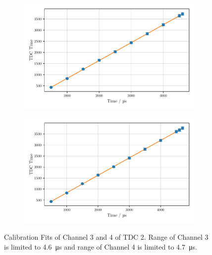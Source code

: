 \begin{figure}
    \centering
    \begin{subfigure}[b]{0.48\textwidth}
        \includegraphics[width=\textwidth]{plots/tdc10.pdf}
    \end{subfigure}\hfill
    \begin{subfigure}[b]{0.48\textwidth}
        \includegraphics[width=\textwidth]{plots/tdc11.pdf}
    \end{subfigure}
    \caption{Calibration Fits of Channel 3 and 4 of TDC 2. 
    Range of Channel 3 is limited to \SI{4.6}{\micro\second} and range of Channel 4 is limited to \SI{4.7}{\micro\second}.}
    \label{fig:tdc1011}
\end{figure}

